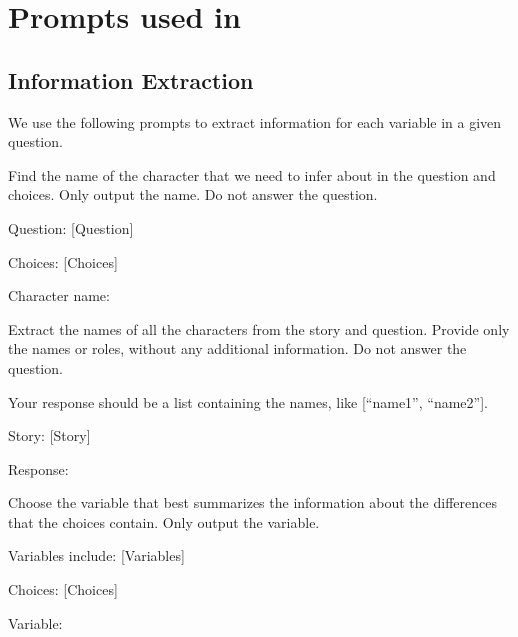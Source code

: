 \section{Prompts used in \ours}
\label{sec:prompts}

\subsection{Information Extraction}
We use the following prompts to extract information for each variable in a given question. 

\begin{tcolorbox}[
    breakable,
    colframe=green!40!black,
    colback=green!5,
    coltitle=white,
    fonttitle=\bfseries,
    title=Identifying the main agent,
    colbacktitle=green!40!black
]
Find the name of the character that we need to infer about in the question and choices. Only output the name. Do not answer the question. \newline

Question: [Question]

Choices: [Choices]

Character name:
\end{tcolorbox}



\begin{tcolorbox}[
    breakable,
    colframe=green!40!black,
    colback=green!5,
    coltitle=white,
    fonttitle=\bfseries,
    title=Identifying all the agents,
    colbacktitle=green!40!black
]
Extract the names of all the characters from the story and question. Provide only the names or roles, without any additional information. Do not answer the question.

Your response should be a list containing the names, like [``name1'', ``name2'']. \newline

Story: [Story]

Response: 
\end{tcolorbox}


\begin{tcolorbox}[
    breakable,
    colframe=green!40!black,
    colback=green!5,
    coltitle=white,
    fonttitle=\bfseries,
    title=Identifying the mental variable to be inferred,
    colbacktitle=green!40!black
]
Choose the variable that best summarizes the information about the differences that the choices contain. Only output the variable. \newline

Variables include: [Variables]

Choices: [Choices]

Variable: 
\end{tcolorbox}


